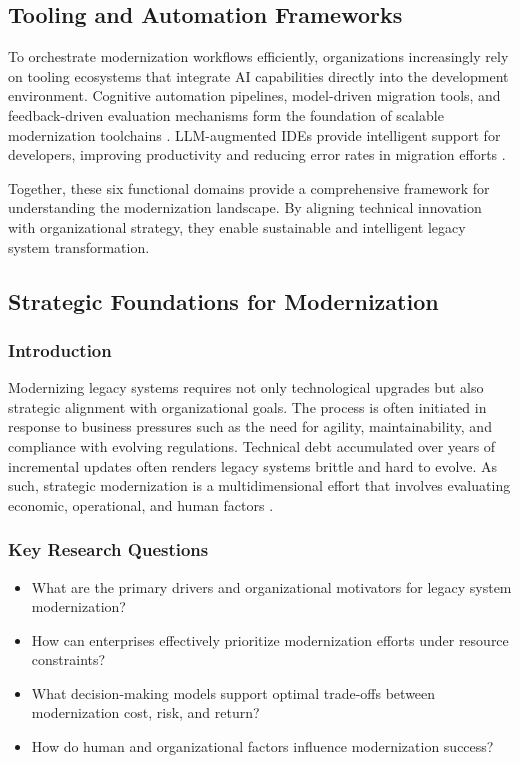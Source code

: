 \documentclass[12pt]{article}
\begin{document}
\subsection{Tooling and Automation Frameworks}

To orchestrate modernization workflows efficiently, organizations increasingly rely on tooling ecosystems that integrate AI capabilities directly into the development environment. Cognitive automation pipelines, model-driven migration tools, and feedback-driven evaluation mechanisms form the foundation of scalable modernization toolchains \cite{bhoopalam2023, moryossef2023}. LLM-augmented IDEs provide intelligent support for developers, improving productivity and reducing error rates in migration efforts \cite{googlemigrate2025}.

Together, these six functional domains provide a comprehensive framework for understanding the modernization landscape. By aligning technical innovation with organizational strategy, they enable sustainable and intelligent legacy system transformation.

\subsection{Strategic Foundations for Modernization}

\subsubsection{Introduction}

Modernizing legacy systems requires not only technological upgrades but also strategic alignment with organizational goals. The process is often initiated in response to business pressures such as the need for agility, maintainability, and compliance with evolving regulations. Technical debt accumulated over years of incremental updates often renders legacy systems brittle and hard to evolve. As such, strategic modernization is a multidimensional effort that involves evaluating economic, operational, and human factors \cite{assuncao2025}.

\subsubsection{Key Research Questions}

\begin{itemize}
    \item What are the primary drivers and organizational motivators for legacy system modernization?
    \item How can enterprises effectively prioritize modernization efforts under resource constraints?
    \item What decision-making models support optimal trade-offs between modernization cost, risk, and return?
    \item How do human and organizational factors influence modernization success?
\end{itemize}
\end{document}
